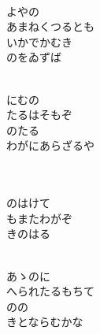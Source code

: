 \documentclass[10pt,b5j]{tarticle} %
\begin{document}
\begin{enumerate}
\begin{minipage}[c]{\blocksize}
    \end{minipage}
    \begin{minipage}[c]{\blocksize}
        
        \vspace{\linespace}
        \item~\\
        よやの\\
        あまねくつるとも\\
        いかでかむき\\
        のをゐずば
        
    \end{minipage}
    \begin{minipage}[c]{\blocksize}
        
        \vspace{\linespace}
        \item~\\
        にむの\\
        たるはそもぞ\\
        のたる\\
        わがにあらざるや
        
    \end{minipage}
    \begin{minipage}[c]{\blocksize}
        
        \vspace{\linespace}
        \item~\\
        \\
        のはけて\\
        もまたわがぞ\\
        きのはる
        
    \end{minipage}
    \begin{minipage}[c]{\blocksize}
        
        \vspace{\linespace}
        \item~\\
        あゝのに\\
        へられたるもちて\\
        のの\\
        きとならむかな
        

\end{minipage}
\end{enumerate}
\end{document}
